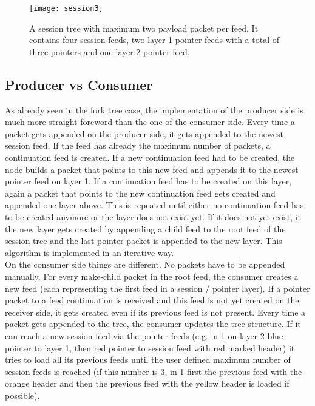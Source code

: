 \begin{figure}
\centering
\texttt{[image: session3]}
\caption{A session tree with maximum two payload packet per feed. It contains four session feeds, two layer 1 pointer feeds with a total of three pointers and one layer 2 pointer feed.}
\label{fig:session3}
\end{figure}



\subsection{Producer vs Consumer}
As already seen in the fork tree case, the implementation of the producer side is much more straight foreword than the one of the consumer side. Every time a packet gets appended on the producer side, it gets appended to the newest session feed. If the feed has already the maximum number of packets, a continuation feed is created. If a new continuation feed had to be created, the node builds a packet that points to this new feed and appends it to the newest pointer feed on layer 1. If a continuation feed has to be created on this layer, again a packet that points to the new continuation feed gets created and appended one layer above. This is repeated until either no continuation feed has to be created anymore or the layer does not exist yet. If it does not yet exist, it the new layer gets created by appending a child feed to the root feed of the session tree and the last pointer packet is appended to the new layer. This algorithm is implemented in an iterative way. \\
On the consumer side things are different. No packets have to be appended manually. For every make-child packet in the root feed, the consumer creates a new feed (each representing the first feed in a session / pointer layer). If a pointer packet to a feed continuation is received and this feed is not yet created on the receiver side, it gets created even if its previous feed is not present. Every time a packet gets appended to the tree, the consumer updates the tree structure. If it can reach a new session feed via the pointer feeds (e.g. in \cref{fig:session3} on layer 2 blue pointer to layer 1, then red pointer to session feed with red marked header) it tries to load all its previous feeds until the user defined maximum number of session feeds is reached (if this number is 3, in \cref{fig:session3} first the previous feed with the orange header and then the previous feed with the yellow header is loaded if possible).


